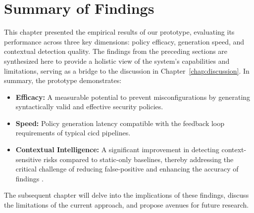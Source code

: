 
\section{Summary of Findings}\label{sec:summary-findings}

This chapter presented the empirical results of our prototype, evaluating its performance across three key dimensions: policy efficacy, generation speed, and contextual detection quality. The findings from the preceding sections are synthesized here to provide a holistic view of the system's capabilities and limitations, serving as a bridge to the discussion in Chapter~\ref{chap:discussion}.
In summary, the prototype demonstrates:
\begin{itemize}
    \item \textbf{Efficacy:} A measurable potential to prevent misconfigurations by generating syntactically valid and effective security policies.
    \item \textbf{Speed:} Policy generation latency compatible with the feedback loop requirements of typical \gls{cicd} pipelines.
    \item \textbf{Contextual Intelligence:} A significant improvement in detecting context-sensitive risks compared to static-only baselines, thereby addressing the critical challenge of reducing \gls{false-positive} and enhancing the accuracy of findings \cite{zheng_context-aware_2023}.
\end{itemize}

The subsequent chapter will delve into the implications of these findings, discuss the limitations of the current approach, and propose avenues for future research.